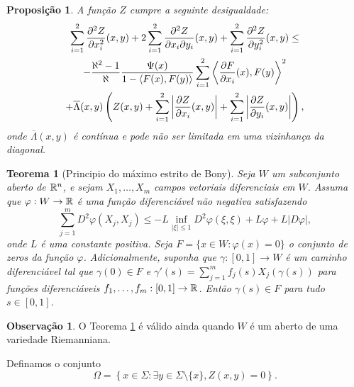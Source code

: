 \documentclass[12pt,a4paper]{beamer}
\newtheorem{teorema}{Teorema}
\newtheorem{proposicao}{Proposição}
\theoremstyle{definition}
\newtheorem{observacao}{Observação}
\begin{document}
\begin{frame}[allowframebreaks]
	\begin{proposicao}\label{sum-2nd-derivative-z-inequality}
		A função $Z$ cumpre a seguinte desigualdade:
		\begin{multline*}
			\sum_{i=1}^{2} \frac{\partial^2 Z}{\partial x_i^2}(x,y) + 2 \sum_{i=1}^{2} \frac{\partial^2 Z}{\partial x_i \partial y_i}(x,y) + \sum_{i=1}^{2} \frac{\partial^2 Z}{\partial y_i^2}(x,y) \leq \\
			- \frac{\aleph^2 -1}{\aleph} \frac{\Psi(x)}{1 - \left\langle F(x),F(y) \right\rangle} \sum_{i=1}^{2} \left\langle \frac{\partial F}{\partial x_i}(x),F(y) \right\rangle^2 \\ 
			+ \overline{\Lambda}(x,y) \left( Z(x,y) + \sum_{i=1}^{2} \left| \frac{\partial Z}{\partial x_i}(x,y) \right| + \sum_{i=1}^{2} \left| \frac{\partial Z}{\partial y_i}(x,y) \right| \right),
		\end{multline*}
		onde $\overline{\Lambda}(x,y)$ é contínua e pode não ser limitada em uma vizinhança da diagonal.
	\end{proposicao}

	\begin{teorema}[Principio do máximo estrito de Bony]
		\label{bony's-strict-maximum-principe}
		Seja $W$ um subconjunto aberto de $\mathbb R^n$, e sejam $X_1, \ldots, X_m$ campos vetoriais diferenciais em $W$. Assuma que $\varphi: W \rightarrow \mathbb R$ é uma função diferenciável não negativa satisfazendo
		\begin{equation*}
			\sum_{j=1}^{m} D^2 \varphi (X_j,X_j) \leq -L \inf_{|\xi| \leq 1} D^2 \varphi(\xi,\xi) + L \varphi + L |D \varphi|,
		\end{equation*}
		onde $L$ é uma constante positiva. Seja $F= \{ x \in W: \varphi(x)=0 \}$ o conjunto de zeros da função $\varphi$. Adicionalmente, suponha que $\gamma: [0,1] \rightarrow W$ é um caminho diferenciável tal que $\gamma(0) \in F$ e $\gamma'(s) = \sum_{j=1}^{m} f_j(s) X_j(\gamma(s))$ para funções diferenciáveis $f_1, \ldots, f_m: [0,1] \rightarrow \mathbb R$. Então $\gamma(s) \in F$ para tudo $s \in [0,1]$.
	\end{teorema}

	\begin{observacao}
		O Teorema \ref{bony's-strict-maximum-principe} é válido ainda quando $W$ é um aberto de uma variedade Riemanniana. 
	\end{observacao}

	Definamos o conjunto
	\begin{equation*}
	\Omega = \left\{ x \in \Sigma: \exists y \in \Sigma \setminus \{ x \}, Z(x,y)=0 \right\}.
	\end{equation*}
	

\end{frame}
\end{document}
